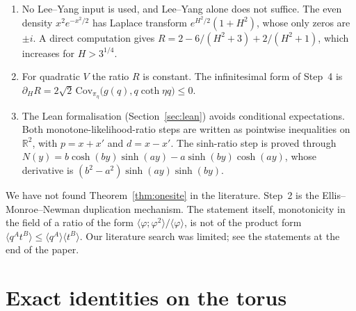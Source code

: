 \begin{remark}
\begin{enumerate}
\item No Lee--Yang input is used, and Lee--Yang alone does not suffice. The even density $x^2e^{-x^2/2}$ has Laplace transform $e^{H^2/2}(1+H^2)$, whose only zeros are $\pm i$. A direct computation gives $R=2-6/(H^2+3)+2/(H^2+1)$, which increases for $H>3^{1/4}$.
\item For quadratic $V$ the ratio $R$ is constant. The infinitesimal form of Step~4 is $\partial_HR=2\sqrt2\,\mathrm{Cov}_{\pi_\eta}\big(g(q),q\coth\eta q\big)\le0$.
\item The Lean formalisation (Section~\ref{sec:lean}) avoids conditional expectations. Both monotone-likelihood-ratio steps are written as pointwise inequalities on $\mathbb R^2$, with $p=x+x'$ and $d=x-x'$. The sinh-ratio step is proved through $N(y)=b\cosh(by)\sinh(ay)-a\sinh(by)\cosh(ay)$, whose derivative is $(b^2-a^2)\sinh(ay)\sinh(by)$.
\end{enumerate}
\end{remark}

We have not found Theorem~\ref{thm:onesite} in the literature. Step~2 is the Ellis--Monroe--Newman duplication mechanism. The statement itself, monotonicity in the field of a ratio of the form $\langle\varphi;\varphi^2\rangle/\langle\varphi\rangle$, is not of the product form $\langle q^At^B\rangle\le\langle q^A\rangle\langle t^B\rangle$. Our literature search was limited; see the statements at the end of the paper.

\section{Exact identities on the torus}\label{sec:identities}

